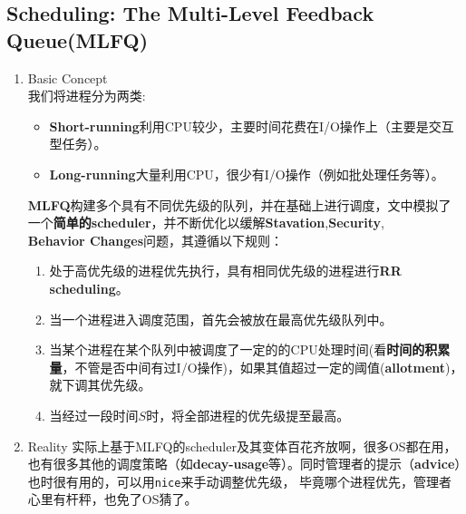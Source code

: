 \documentclass{article}
\begin{document}
\subsection{Scheduling: The Multi-Level Feedback Queue(MLFQ)}
\begin{enumerate}
    \item Basic Concept \\
    我们将进程分为两类:
    \begin{itemize}
        \item \textbf{Short-running}利用CPU较少，主要时间花费在I/O操作上（主要是交互型任务）。
        \item \textbf{Long-running}大量利用CPU，很少有I/O操作（例如批处理任务等）。
    \end{itemize}
    \textbf{MLFQ}构建多个具有不同优先级的队列，并在基础上进行调度，文中模拟了一个\textbf{简单的scheduler}，并不断优化以缓解\textbf{Stavation},\textbf{Security},\\
    \textbf{Behavior Changes}问题，其遵循以下规则：
    \begin{enumerate}
        \item 处于高优先级的进程优先执行，具有相同优先级的进程进行\textbf{RR scheduling}。
        \item 当一个进程进入调度范围，首先会被放在最高优先级队列中。
        \item 当某个进程在某个队列中被调度了一定的的CPU处理时间(看\textbf{时间的积累量}，不管是否中间有过I/O操作)，如果其值超过一定的阈值(\textbf{allotment})，就下调其优先级。
        \item 当经过一段时间$S$时，将全部进程的优先级提至最高。
    \end{enumerate}
    \item Reality
    实际上基于MLFQ的scheduler及其变体百花齐放啊，很多OS都在用，也有很多其他的调度策略（如\textbf{decay-usage}等）。同时管理者的提示（\textbf{advice}）也时很有用的，可以用\texttt{nice}来手动调整优先级，
    毕竟哪个进程优先，管理者心里有杆秤，也免了OS猜了。
\end{enumerate}
\end{document}
